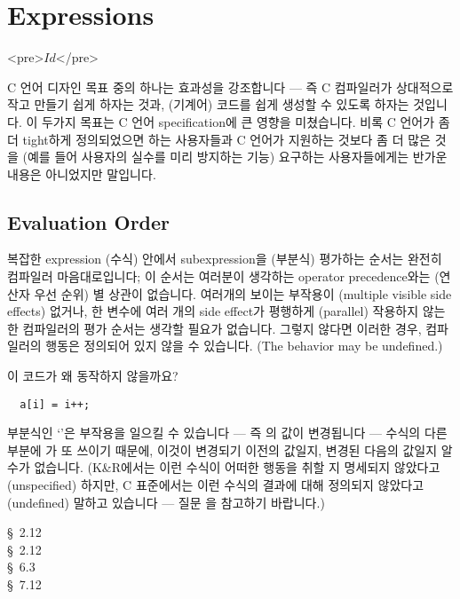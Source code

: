 \chapter{Expressions}	\label{chap:expr}

\begin{rawhtml}
<pre>$Id$</pre>
\end{rawhtml}

C 언어 디자인 목표 중의 하나는 효과성을 강조합니다 --- 즉 C 컴파일러가
상대적으로 작고 만들기 쉽게 하자는 것과, (기계어) 코드를 쉽게 생성할 수
있도록 하자는 것입니다.  이 두가지 목표는 C 언어 specification에 큰 영향을
미쳤습니다.  비록 C 언어가 좀 더 tight하게 정의되었으면 하는 사용자들과
C 언어가 지원하는 것보다 좀 더 많은 것을 (예를 들어 사용자의 실수를 미리
방지하는 기능) 요구하는 사용자들에게는 반가운 내용은 아니었지만 말입니다.

\section{Evaluation Order}
복잡한 expression (수식) 안에서 subexpression을 (부분식) 평가하는 순서는
완전히 컴파일러 마음대로입니다; 이 순서는 여러분이 생각하는
operator precedence와는 (연산자 우선 순위) 별 상관이 없습니다.
여러개의 보이는 부작용이 (multiple visible side effects) 없거나,
한 변수에 여러 개의 side effect가 평행하게 (parallel) 작용하지 않는 한
컴파일러의 평가 순서는 생각할 필요가 없습니다.  그렇지 않다면 이러한 경우,
컴파일러의 행동은 정의되어 있지 않을 수 있습니다. (The behavior may be
undefined.)


\begin{faq}
	이 코드가 왜 동작하지 않을까요?

\begin{verbatim}
  a[i] = i++;
\end{verbatim}

\A
	부분식인 `'은 부작용을 일으킬 수 있습니다 --- 즉 의
	값이 변경됩니다 --- 수식의 다른 부분에 가 또 쓰이기 때문에,
	이것이 변경되기 이전의 값일지, 변경된 다음의 값일지 알 수가
	없습니다.  (K\&R에서는 이런 수식이 어떠한 행동을 취할 지 명세되지
	않았다고(unspecified) 하지만, C 표준에서는 이런 수식의 결과에 대해
	정의되지 않았다고(undefined)  말하고 있습니다 ---
	질문 을 참고하기 바랍니다.)

\R
	\cite{kr1} \S\ 2.12 \\
	\cite{kr2} \S\ 2.12 \\
	\cite{c89} \S\ 6.3 \\
	\cite{hs} \S\ 7.12 
\end{faq}

